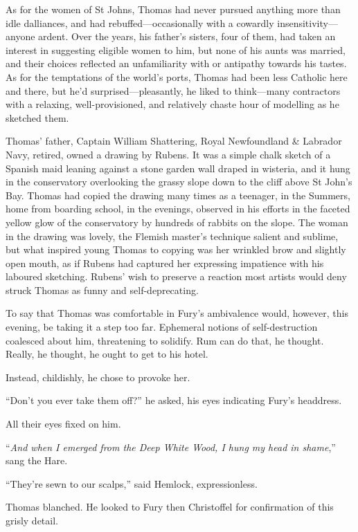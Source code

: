 \documentclass[11pt,a5paper]{article}
\begin{document}
As for the women of St Johns, Thomas had never pursued anything more than idle dalliances, and had rebuffed---occasionally with a cowardly insensitivity---anyone ardent. Over the years, his father's sisters, four of them, had taken an interest in suggesting eligible women to him, but none of his aunts was married, and their choices reflected an unfamiliarity with or antipathy towards his tastes. As for the temptations of the world's ports, Thomas had been less Catholic here and there, but he'd surprised---pleasantly, he liked to think---many contractors with a relaxing, well-provisioned, and relatively chaste hour of modelling as he sketched them.

Thomas' father, Captain William Shattering, Royal Newfoundland \& Labrador Navy, retired, owned a drawing by Rubens. It was a simple chalk sketch of a Spanish maid leaning against a stone garden wall draped in wisteria, and it hung in the conservatory overlooking the grassy slope down to the cliff above St John's Bay. Thomas had copied the drawing many times as a teenager, in the Summers, home from boarding school, in the evenings, observed in his efforts in the faceted yellow glow of the conservatory by hundreds of rabbits on the slope. The woman in the drawing was lovely, the Flemish master's technique salient and sublime, but what inspired young Thomas to copying was her wrinkled brow and slightly open mouth, as if Rubens had captured her expressing impatience with his laboured sketching. Rubens' wish to preserve a reaction most artists would deny struck Thomas as funny and self-deprecating.

To say that Thomas was comfortable in Fury's ambivalence would, however, this evening, be taking it a step too far. Ephemeral notions of self-destruction coalesced about him, threatening to solidify. Rum can do that, he thought. Really, he thought, he ought to get to his hotel.

Instead, childishly, he chose to provoke her.

``Don't you ever take them off?'' he asked, his eyes indicating Fury's headdress.

All their eyes fixed on him.

``\emph{And when I emerged from the Deep White Wood, I hung my head in shame},'' sang the Hare.

``They're sewn to our scalps,'' said Hemlock, expressionless.

Thomas blanched. He looked to Fury then Christoffel for confirmation of this grisly detail.
\end{document}
